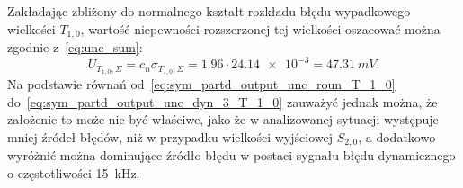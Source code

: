 Zakładając zbliżony do normalnego kształt rozkładu błędu wypadkowego wielkości $T_{1,0}$, wartość niepewności rozszerzonej tej wielkości oszacować można zgodnie z~\eqref{eq:unc_sum}:
\begin{equation}
U_{T_{1,0},\Sigma} = c_{n} \sigma_{T_{1,0},\Sigma} = 1.96 \cdot \num{24.14e-3} = \qty{47.31}{mV} \label{eq:sym_partd_output_unc_total_a_T_1_0}.
\end{equation}
Na podstawie równań od~\eqref{eq:sym_partd_output_unc_roun_T_1_0} do~\eqref{eq:sym_partd_output_unc_dyn_3_T_1_0} zauważyć jednak można, że założenie to może nie być właściwe, jako że w analizowanej sytuacji występuje mniej źródeł błędów, niż w przypadku wielkości wyjściowej $S_{2,0}$, a dodatkowo wyróżnić można dominujące źródło błędu w postaci sygnału błędu dynamicznego o częstotliwości \qty{15}{kHz}.

